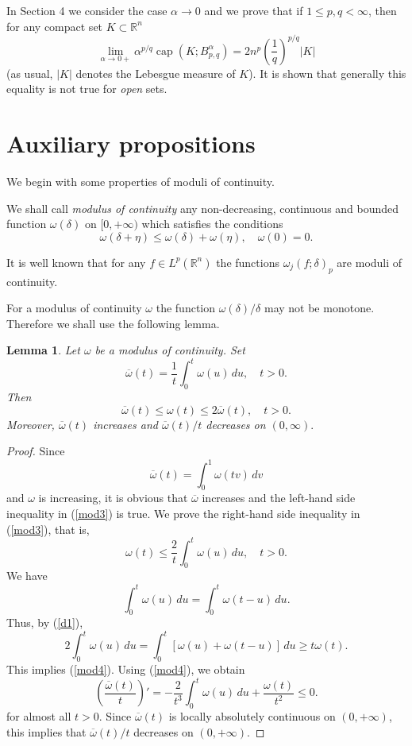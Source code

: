 \documentclass[12pt,twoside,reqno]{amsart}
\numberwithin{equation}{section}
\newtheorem{lem}[teo]{Lemma}
\theoremstyle{definition}
\numberwithin{equation}{section}
\begin{document}
In Section 4 we consider the case ${\alpha}\to 0$ and we prove that if
$1\le p, q<\infty$, then for any compact set $K\subset {\mathbb{R}}^n$
$$
\lim_{{\alpha}\to 0+}{\alpha}^{p/q}{\operatorname{cap}} (K;B_{p,q}^{\alpha})=2n^p\left(\frac1q\right)^{p/q}|K|
$$
(as usual, $|K|$ denotes the Lebesgue measure of $K$). It is shown that generally this equality is not true for {\it open}
sets.

\section{Auxiliary propositions}

We begin with some  properties of  moduli of continuity.

We shall call {\it modulus of continuity} any non-decreasing,
continuous and bounded function ${\omega}({\delta})$ on $[0,+\infty)$ which
satisfies the conditions
\begin{equation}\label{d1}
 {\omega}({\delta}+\eta)\le {\omega}({\delta})+{\omega}(\eta),
\quad {\omega}(0)=0.
\end{equation}

It is well known that for any $f\in L^p({\mathbb R}^n)$ the functions
${\omega}_j(f;{\delta})_p$ are moduli of continuity.

For a modulus of continuity ${\omega}$ the function ${\omega}({\delta})/{\delta}$ may not be
monotone. Therefore we shall use the following lemma.

\begin{lem}\label{MOD1} Let ${\omega}$ be a modulus of continuity. Set
$$
\overline{\omega}(t)=\frac1t\int_0^t{\omega}(u)\,du,\quad t>0.
$$
Then
\begin{equation}\label{mod3}
\overline{\omega}(t)\le{\omega}(t)\le 2\overline{\omega}(t),\quad t>0.
\end{equation}
Moreover, $\overline{\omega}(t)$ increases and $\overline{\omega}(t)/t$
decreases on $(0,\infty).$
\end{lem}
\begin{proof} Since
$$
\overline{\omega}(t)=\int_0^1 {\omega}(tv)\,dv
$$
and ${\omega}$ is increasing, it is obvious that $\overline{\omega}$ increases
and the left-hand side inequality in (\ref{mod3}) is true. We prove
the right-hand side inequality in (\ref{mod3}), that is,
\begin{equation}\label{mod4}
{\omega}(t)\le \frac2t\int_0^t{\omega}(u)\,du,\quad t>0.
\end{equation}
We have
$$
\int_0^t{\omega}(u)\,du=\int_0^t{\omega}(t-u)\,du.
$$
Thus, by (\ref{d1}),
$$
2\int_0^t{\omega}(u)\,du=\int_0^t[{\omega}(u)+{\omega}(t-u)]\,du\ge t{\omega}(t).
$$
This implies (\ref{mod4}). Using (\ref{mod4}), we obtain
$$
\left(\frac{\overline{\omega}(t)}{t}\right)'=-\frac{2}{t^3}\int_0^t{\omega}(u)\,du+\frac{{\omega}(t)}{t^2}\le 0.
$$
for almost all $t>0.$ Since $\overline{\omega}(t)$ is locally absolutely continuous on $(0,+\infty)$, this implies that $\overline{\omega}(t)/t$ decreases on $(0,+\infty).$
\end{proof}
\end{document}
